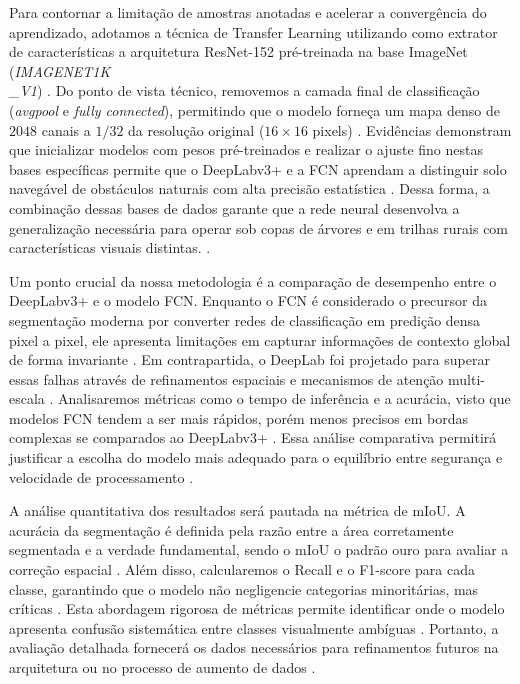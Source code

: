 \documentclass[a4paper,10pt, twocolumn]{article}
\begin{document}
Para contornar a limitação de amostras anotadas e acelerar a convergência do aprendizado, adotamos a técnica de Transfer Learning utilizando como extrator 
de características a arquitetura ResNet-152 pré-treinada na base ImageNet (\textit{IMAGENET1K\\\_V1}) \cite{He2016, Sgibnev2020}. Do ponto de vista técnico, 
removemos a camada final de classificação (\textit{avgpool} e \textit{fully connected}), permitindo que o modelo forneça um mapa denso 
de $2048$ canais a $1/32$ da resolução original ($16 \times 16$ pixels) \cite{He2016, LATEEF2019321}. Evidências 
demonstram que inicializar modelos com pesos pré-treinados e realizar o ajuste fino nestas 
bases específicas permite que o DeepLabv3+ e a FCN aprendam a distinguir solo navegável de obstáculos 
naturais com alta precisão estatística \cite{10742323, s26061944}. Dessa forma, a combinação dessas bases 
de dados garante que a rede neural desenvolva a generalização necessária para operar sob copas de árvores 
e em trilhas rurais com características visuais distintas. \cite{s26061944, s19112577}.

Um ponto crucial da nossa metodologia é a comparação de desempenho entre o DeepLabv3+ e o modelo FCN. 
Enquanto o FCN é considerado o precursor da segmentação moderna por converter redes de classificação em predição densa pixel a pixel, 
ele apresenta limitações em capturar informações de contexto global de forma invariante \cite{GARCIAGARCIA201841, DBLP:journals/corr/Garcia-GarciaOO17}. Em contrapartida, o DeepLab foi projetado 
para superar essas falhas através de refinamentos espaciais e mecanismos de atenção multi-escala \cite{LATEEF2019321, GARCIAGARCIA201841}. Analisaremos métricas como o 
tempo de inferência e a acurácia, visto que modelos FCN tendem a ser mais rápidos, porém menos precisos em bordas complexas se 
comparados ao DeepLabv3+ \cite{Maturana2017, Long_2015_CVPR}. Essa análise comparativa permitirá justificar a escolha do modelo mais adequado para o equilíbrio entre 
segurança e velocidade de processamento \cite{DBLP:journals/corr/Garcia-GarciaOO17, BEYCIMEN2026113680}.

A análise quantitativa dos resultados será pautada na métrica de mIoU. 
A acurácia da segmentação é definida pela razão entre a área corretamente segmentada e a verdade fundamental, 
sendo o mIoU o padrão ouro para avaliar a correção espacial \cite{LATEEF2019321, 9288755}. Além disso, calcularemos o Recall e o F1-score para cada classe, 
garantindo que o modelo não negligencie categorias minoritárias, mas críticas \cite{10742323}. Esta abordagem 
rigorosa de métricas permite identificar onde o modelo apresenta confusão sistemática entre classes visualmente ambíguas \cite{s26061944}. 
Portanto, a avaliação detalhada fornecerá os dados necessários para refinamentos futuros na arquitetura ou no processo de 
aumento de dados \cite{10742323, s26061944}.
\end{document}
